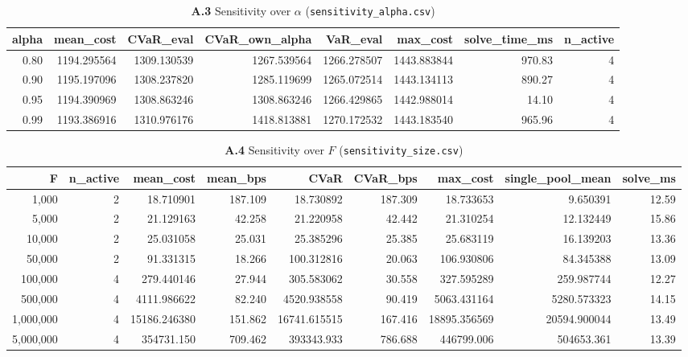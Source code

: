 \documentclass[11pt,a4paper]{article}
\theoremstyle{remark}
\newcommand{\code}[1]{\texttt{#1}}
\begin{document}
\begin{landscape}
\begin{table}[H]
\centering
\caption*{\textbf{A.3} Sensitivity over $\alpha$ (\code{sensitivity\_alpha.csv})}
\scriptsize
\begin{tabular}{@{}rrrrrrrr@{}}
\toprule
alpha & mean\_cost & CVaR\_eval & CVaR\_own\_alpha & VaR\_eval & max\_cost &
solve\_time\_ms & n\_active \\
\midrule
0.80 & 1194.295564 & 1309.130539 & 1267.539564 & 1266.278507 & 1443.883844 & 970.83 & 4 \\
0.90 & 1195.197096 & 1308.237820 & 1285.119699 & 1265.072514 & 1443.134113 & 890.27 & 4 \\
0.95 & 1194.390969 & 1308.863246 & 1308.863246 & 1266.429865 & 1442.988014 & 14.10 & 4 \\
0.99 & 1193.386916 & 1310.976176 & 1418.813881 & 1270.172532 & 1443.183540 & 965.96 & 4 \\
\bottomrule
\end{tabular}
\end{table}

\begin{table}[H]
\centering
\caption*{\textbf{A.4} Sensitivity over $F$ (\code{sensitivity\_size.csv})}
\scriptsize
\begin{tabular}{@{}rrrrrrrrr@{}}
\toprule
F & n\_active & mean\_cost & mean\_bps & CVaR & CVaR\_bps & max\_cost & single\_pool\_mean &
solve\_ms \\
\midrule
1{,}000 & 2 & 18.710901 & 187.109 & 18.730892 & 187.309 & 18.733653 & 9.650391 & 12.59 \\
5{,}000 & 2 & 21.129163 & 42.258 & 21.220958 & 42.442 & 21.310254 & 12.132449 & 15.86 \\
10{,}000 & 2 & 25.031058 & 25.031 & 25.385296 & 25.385 & 25.683119 & 16.139203 & 13.36 \\
50{,}000 & 2 & 91.331315 & 18.266 & 100.312816 & 20.063 & 106.930806 & 84.345388 & 13.09 \\
100{,}000 & 4 & 279.440146 & 27.944 & 305.583062 & 30.558 & 327.595289 & 259.987744 & 12.27 \\
500{,}000 & 4 & 4111.986622 & 82.240 & 4520.938558 & 90.419 & 5063.431164 & 5280.573323 & 14.15 \\
1{,}000{,}000 & 4 & 15186.246380 & 151.862 & 16741.615515 & 167.416 & 18895.356569 &
20594.900044 & 13.49 \\
5{,}000{,}000 & 4 & 354731.150 & 709.462 & 393343.933 & 786.688 & 446799.006 &
504653.361 & 13.39 \\
\bottomrule
\end{tabular}
\end{table}


\end{landscape}
\end{document}
